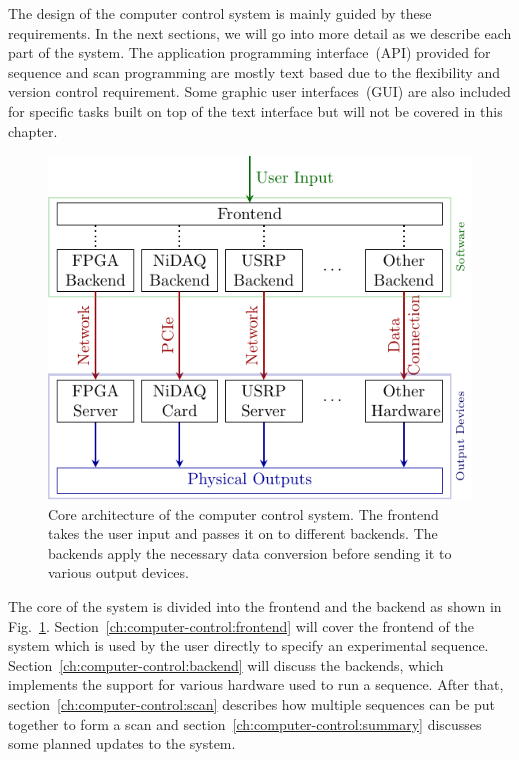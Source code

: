 The design of the computer control system is mainly guided by these requirements.
In the next sections, we will go into more detail as we describe each part of the system.
The application programming interface~(API) provided for sequence and scan programming
are mostly text based due to the flexibility and version control requirement.
Some graphic user interfaces~(GUI) are also included for specific tasks
built on top of the text interface but will not be covered in this chapter.

\begin{figure}
  \centering
  \includegraphics[width=\textwidth]{figures/computer_control_overview.pdf}
  \caption[Core architecture of the computer control system]{
    Core architecture of the computer control system.
    The frontend takes the user input and passes it on to different backends.
    The backends apply the necessary data conversion before sending it
    to various output devices.
    \label{fig:computer-control:introduction:architecture}}
\end{figure}

The core of the system is divided into the frontend and the backend
as shown in Fig.~\ref{fig:computer-control:introduction:architecture}.
Section~\ref{ch:computer-control:frontend} will cover the frontend of the system
which is used by the user directly to specify an experimental sequence.
Section~\ref{ch:computer-control:backend} will discuss the backends,
which implements the support for various hardware used to run a sequence.
After that, section~\ref{ch:computer-control:scan} describes how multiple sequences
can be put together to form a scan and section~\ref{ch:computer-control:summary}
discusses some planned updates to the system.

